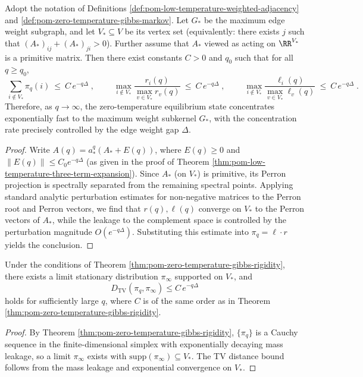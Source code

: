 \begin{theorem}\label{thm:pom-zero-temperature-gibbs-rigidity}
Adopt the notation of Definitions \ref{def:pom-low-temperature-weighted-adjacency} and \ref{def:pom-zero-temperature-gibbs-markov}.
Let \(G_*\) be the maximum edge weight subgraph, and let \(V_*\subseteq V\) be its vertex set (equivalently: there exists \(j\) such that \((A_*)_{ij}+(A_*)_{ji}>0\)).
Further assume that \(A_*\) viewed as acting on \(\RR^{V_*}\) is a primitive matrix.
Then there exist constants \(C>0\) and \(q_0\) such that for all \(q\ge q_0\),
\[
\boxed{\;
\sum_{i\notin V_*}\pi_q(i)\ \le\ C\,e^{-q\Delta}\; },
\qquad
\boxed{\;
\max_{i\notin V_*}\frac{r_i(q)}{\max_{v\in V_*}r_v(q)}\ \le\ C\,e^{-q\Delta}\; },
\qquad
\boxed{\;
\max_{i\notin V_*}\frac{\ell_i(q)}{\max_{v\in V_*}\ell_v(q)}\ \le\ C\,e^{-q\Delta}\; }.
\]
Therefore, as \(q\to\infty\), the zero-temperature equilibrium state concentrates exponentially fast to the maximum weight subkernel \(G_*\), with the concentration rate precisely controlled by the edge weight gap \(\Delta\).
\end{theorem}
\begin{proof}
Write \(A(q)=a_*^q(A_*+E(q))\), where \(E(q)\ge0\) and \(\|E(q)\|\le C_0e^{-q\Delta}\) (as given in the proof of Theorem \ref{thm:pom-low-temperature-three-term-expansion}).
Since \(A_*\) (on \(V_*\)) is primitive, its Perron projection is spectrally separated from the remaining spectral points.
Applying standard analytic perturbation estimates for non-negative matrices to the Perron root and Perron vectors, we find that \(r(q),\ell(q)\) converge on \(V_*\) to the Perron vectors of \(A_*\), while the leakage to the complement space is controlled by the perturbation magnitude \(O(e^{-q\Delta})\).
Substituting this estimate into \(\pi_q=\ell\cdot r\) yields the conclusion.
\end{proof}

\begin{corollary}\label{cor:pom-zero-temperature-gibbs-limit}
Under the conditions of Theorem \ref{thm:pom-zero-temperature-gibbs-rigidity}, there exists a limit stationary distribution \(\pi_\infty\) supported on \(V_*\), and
\[
D_{\mathrm{TV}}(\pi_q,\pi_\infty)\le C\,e^{-q\Delta}
\]
holds for sufficiently large \(q\), where \(C\) is of the same order as in Theorem \ref{thm:pom-zero-temperature-gibbs-rigidity}.
\end{corollary}
\begin{proof}
By Theorem \ref{thm:pom-zero-temperature-gibbs-rigidity}, \(\{\pi_q\}\) is a Cauchy sequence in the finite-dimensional simplex with exponentially decaying mass leakage, so a limit \(\pi_\infty\) exists with \(\mathrm{supp}(\pi_\infty)\subseteq V_*\).
The TV distance bound follows from the mass leakage and exponential convergence on \(V_*\).
\end{proof}

